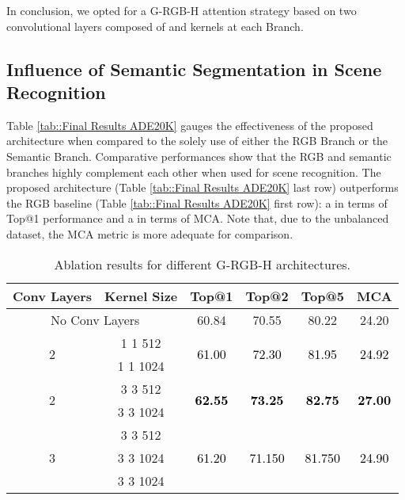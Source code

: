 \documentclass[review, 3p, sort&compress]{elsarticle}
\begin{document}
In conclusion, we opted for a G-RGB-H attention strategy based on two convolutional layers composed of  and  kernels at each Branch.

\subsection*{Influence of Semantic Segmentation in Scene Recognition}
Table \ref{tab::Final Results ADE20K} gauges the effectiveness of the proposed architecture when compared to the solely use of either the RGB Branch or the Semantic Branch. Comparative performances show that the RGB and semantic branches highly complement each other when used for scene recognition. The proposed architecture (Table \ref{tab::Final Results ADE20K} last row) outperforms the RGB baseline (Table \ref{tab::Final Results ADE20K} first row): a  in terms of Top@1 performance and a  in terms of MCA. Note that, due to the unbalanced dataset, the MCA metric is more adequate for comparison.

\begin{table}[t!]
    \begin{centering}
    \footnotesize
    \renewcommand{\arraystretch}{1.2}
    \begin{tabular}{cccccc}
        \hline 
        Conv Layers & Kernel Size & Top@1 & Top@2 & Top@5 & MCA\tabularnewline
        \hline 
        \multicolumn{2}{c}{No Conv Layers} & 60.84 & 70.55 & 80.22 & 24.20 \tabularnewline
        \hline 
        \multirow{2}{*}{2} & 1  1  512 & \multirow{2}{*}{\textcolor{black}{61.00}} & \multirow{2}{*}{\textcolor{black}{72.30}} & \multirow{2}{*}{\textcolor{black}{81.95}} & \multirow{2}{*}{\textcolor{black}{24.92}}\tabularnewline
         & 1  1  1024 &  &  &  & \tabularnewline
        \hline 
        \multirow{2}{*}{2} & 3  3  512 & \multirow{2}{*}{\textbf{\textcolor{black}{62.55}}} & \multirow{2}{*}{\textbf{\textcolor{black}{73.25}}} & \multirow{2}{*}{\textbf{\textcolor{black}{82.75}}} & \multirow{2}{*}{\textbf{\textcolor{black}{27.00}}}\tabularnewline
         & 3  3  1024 &  &  &  & \tabularnewline
        \hline 
        \multirow{3}{*}{3} & 3  3  512 & \multirow{3}{*}{\textcolor{black}{61.20}} & \multirow{3}{*}{\textcolor{black}{71.150}} & \multirow{3}{*}{\textcolor{black}{81.750}} & \multirow{3}{*}{\textcolor{black}{24.90}}\tabularnewline
         & 3  3  1024 &  &  &  & \tabularnewline
         & 3  3  1024 &  &  &  & \tabularnewline
        \hline 
    \end{tabular}
    \caption{Ablation results for different G-RGB-H architectures.}
    \label{tab:Ablation attention module architectures}
    \par
    \end{centering}
\end{table} 
\end{document}
